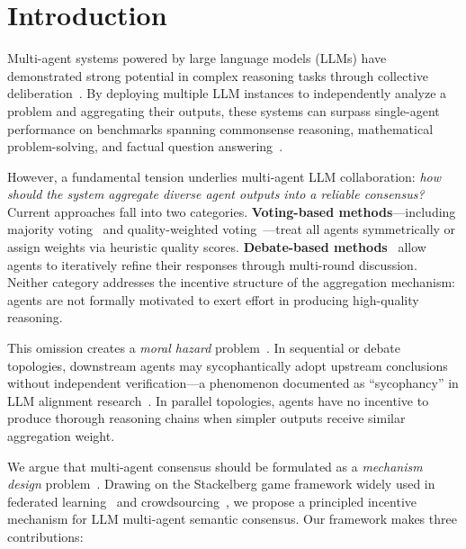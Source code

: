 \documentclass[runningheads]{llncs}
\begin{document}
\section{Introduction}
\label{sec:intro}

Multi-agent systems powered by large language models (LLMs) have demonstrated strong potential in complex reasoning tasks through collective deliberation~\cite{han2024llm,tran2025multiagent}. By deploying multiple LLM instances to independently analyze a problem and aggregating their outputs, these systems can surpass single-agent performance on benchmarks spanning commonsense reasoning, mathematical problem-solving, and factual question answering~\cite{wang2023selfconsistency}.

However, a fundamental tension underlies multi-agent LLM collaboration: \emph{how should the system aggregate diverse agent outputs into a reliable consensus?} Current approaches fall into two categories. \textbf{Voting-based methods}---including majority voting~\cite{wang2023selfconsistency} and quality-weighted voting~\cite{zhao2024electoral}---treat all agents symmetrically or assign weights via heuristic quality scores. \textbf{Debate-based methods}~\cite{choi2025debate,du2024improving} allow agents to iteratively refine their responses through multi-round discussion. Neither category addresses the incentive structure of the aggregation mechanism: agents are not formally motivated to exert effort in producing high-quality reasoning.

This omission creates a \emph{moral hazard} problem~\cite{saig2024incentivizing,kaltenpoth2025agency}. In sequential or debate topologies, downstream agents may sycophantically adopt upstream conclusions without independent verification---a phenomenon documented as ``sycophancy'' in LLM alignment research~\cite{pitre2025consensagent}. In parallel topologies, agents have no incentive to produce thorough reasoning chains when simpler outputs receive similar aggregation weight.

We argue that multi-agent consensus should be formulated as a \emph{mechanism design} problem~\cite{rauba2025principal}. Drawing on the Stackelberg game framework widely used in federated learning~\cite{fu2024stackelberg,guo2023incentive} and crowdsourcing~\cite{wang2024incentive}, we propose a principled incentive mechanism for LLM multi-agent semantic consensus. Our framework makes three contributions:
\end{document}
